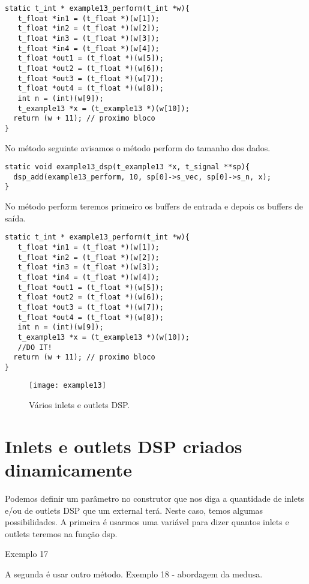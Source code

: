 \begin{lstlisting}
static t_int * example13_perform(t_int *w){
   t_float *in1 = (t_float *)(w[1]);
   t_float *in2 = (t_float *)(w[2]);
   t_float *in3 = (t_float *)(w[3]);
   t_float *in4 = (t_float *)(w[4]);
   t_float *out1 = (t_float *)(w[5]);
   t_float *out2 = (t_float *)(w[6]);
   t_float *out3 = (t_float *)(w[7]);
   t_float *out4 = (t_float *)(w[8]);
   int n = (int)(w[9]);
   t_example13 *x = (t_example13 *)(w[10]);
  return (w + 11); // proximo bloco
}
\end{lstlisting}

No método seguinte avisamos o método perform do tamanho dos dados.
\begin{lstlisting}
static void example13_dsp(t_example13 *x, t_signal **sp){
  dsp_add(example13_perform, 10, sp[0]->s_vec, sp[0]->s_n, x);
}
\end{lstlisting}

No método perform teremos primeiro os buffers de entrada e depois os buffers de
saída.

\begin{lstlisting}
static t_int * example13_perform(t_int *w){
   t_float *in1 = (t_float *)(w[1]);
   t_float *in2 = (t_float *)(w[2]);
   t_float *in3 = (t_float *)(w[3]);
   t_float *in4 = (t_float *)(w[4]);
   t_float *out1 = (t_float *)(w[5]);
   t_float *out2 = (t_float *)(w[6]);
   t_float *out3 = (t_float *)(w[7]);
   t_float *out4 = (t_float *)(w[8]);
   int n = (int)(w[9]);
   t_example13 *x = (t_example13 *)(w[10]);
   //DO IT!
  return (w + 11); // proximo bloco
}
\end{lstlisting}

\begin{figure}[h!]
	\centering
	\texttt{[image: example13]}
	\caption{Vários inlets e outlets DSP.}
\end{figure}

\section{Inlets e outlets DSP criados dinamicamente}

Podemos definir um parâmetro no construtor que nos diga a quantidade de inlets
e/ou de outlets DSP que um external terá. Neste caso, temos algumas
possibilidades. A primeira é usarmos uma variável para dizer quantos inlets e
outlets teremos na função dsp.

Exemplo 17

A segunda é usar outro método. Exemplo 18 - abordagem da medusa.


